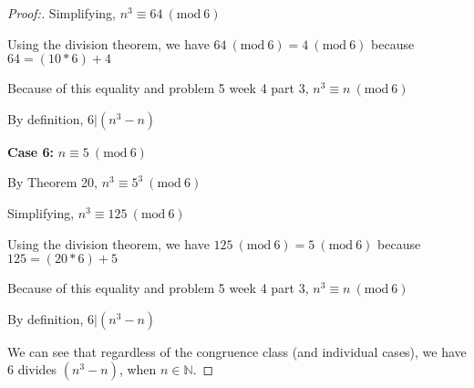 \documentclass[12pt]{article}
\newcommand{\Mod}[1]{\ (\mathrm{mod}\ #1)}
\begin{document}
\begin{proof}[Proof:]
    Simplifying, $n^3 \equiv 64 \Mod{6}$

    Using the division theorem, we have $64 \Mod{6} = 4 \Mod{6}$ because $64 = (10 * 6) + 4$

    Because of this equality and problem 5 week 4 part 3, $n^3 \equiv n \Mod{6}$

    By definition, $6 | (n^3 - n)$

    \medskip

    \textbf{Case 6:} $n \equiv 5 \Mod{6}$

    By Theorem 20,  $n^3 \equiv 5^3 \Mod{6}$

    Simplifying, $n^3 \equiv 125 \Mod{6}$

    Using the division theorem, we have $125 \Mod{6} = 5 \Mod{6}$ because $125 = (20 * 6) + 5$

    Because of this equality and problem 5 week 4 part 3, $n^3 \equiv n \Mod{6}$

    By definition, $6 | (n^3 - n)$

    \medskip
    
    We can see that regardless of the congruence class (and individual cases), we have 6 divides $(n^3 - n)$, when $n \in \mathbb{N}$.
\end{proof}
\end{document}
